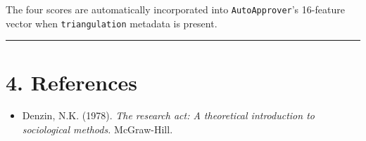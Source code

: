 The four scores are automatically incorporated into \texttt{AutoApprover}'s 16-feature vector when \texttt{triangulation} metadata is present.

\medskip\noindent\rule{\linewidth}{0.4pt}\medskip

\section*{4. References}

\begin{itemize}
  \item [denzin1978research] Denzin, N.K. (1978). \textit{The research act: A theoretical introduction to sociological methods.} McGraw-Hill.
\end{itemize}

